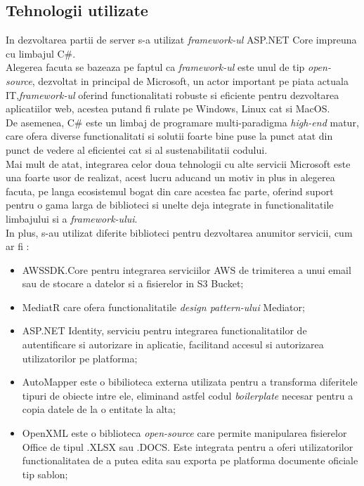 \subsection*{Tehnologii utilizate}
In dezvoltarea partii de server s-a utilizat \textit{framework-ul } ASP.NET Core impreuna cu limbajul C\#.\\
Alegerea facuta se bazeaza pe faptul ca \textit{framework-ul} este unul de tip \textit{open-source}, dezvoltat in principal de Microsoft, un actor important pe piata actuala IT,\textit{framework-ul} oferind functionalitati robuste si eficiente pentru dezvoltarea aplicatiilor web, acestea putand fi rulate pe Windows, Linux cat si MacOS.\\
De asemenea, C\# este un limbaj de programare multi-paradigma \textit{high-end} matur, care ofera diverse functionalitati si solutii foarte bine puse la punct atat din punct de vedere al eficientei cat si al sustenabilitatii codului.\\
Mai mult de atat, integrarea celor doua tehnologii cu alte servicii Microsoft este una foarte usor de realizat, acest lucru aducand un motiv in plus in alegerea facuta, pe langa ecosistemul bogat din care acestea fac parte, oferind suport pentru o gama larga de biblioteci si unelte deja integrate in functionalitatile limbajului si a \textit{framework-ului}.\\
In plus, s-au utilizat diferite biblioteci pentru dezvoltarea anumitor servicii, cum ar fi :
\begin{itemize}
	\item  AWSSDK.Core pentru integrarea serviciilor AWS de trimiterea a unui email sau de stocare a datelor si a fisierelor in S3 Bucket;
	
	\item  MediatR care ofera functionalitatile \textit{design pattern-ului} Mediator;
	
	\item ASP.NET Identity, serviciu pentru integrarea functionalitatilor de autentificare si autorizare in aplicatie, facilitand accesul si autorizarea utilizatorilor pe platforma;
	
	
	\item AutoMapper este o bibilioteca externa utilizata pentru a transforma diferitele tipuri de obiecte intre ele, eliminand astfel codul \textit{boilerplate} necesar pentru a copia datele de la  o entitate la alta;
	
	\item OpenXML este o biblioteca \textit{open-source} care permite manipularea fisierelor Office de tipul .XLSX sau .DOCS. Este integrata pentru a oferi utilizatorilor functionalitatea de a putea edita sau exporta pe platforma documente oficiale tip sablon;
	
\end{itemize}
   

